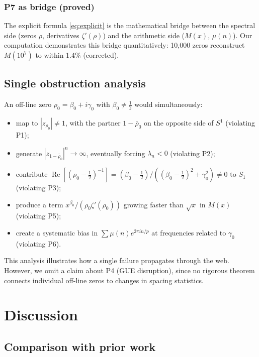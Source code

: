 \documentclass[11pt,a4paper]{article}
\theoremstyle{definition}
\DeclareMathOperator{\re}{Re}
\begin{document}
\subsubsection*{P7 as bridge (proved)}

The explicit formula \eqref{eq:explicit} is the mathematical bridge between the spectral side (zeros $\rho$, derivatives $\zeta'(\rho)$) and the arithmetic side ($M(x)$, $\mu(n)$). Our computation demonstrates this bridge quantitatively: 10{,}000 zeros reconstruct $M(10^7)$ to within 1.4\% (corrected).

\subsection{Single obstruction analysis}

An off-line zero $\rho_0 = \beta_0 + i\gamma_0$ with $\beta_0 \neq \tfrac{1}{2}$ would simultaneously:
\begin{itemize}
  \item map to $|z_{\rho_0}| \neq 1$, with the partner $1-\bar{\rho}_0$ on the opposite side of $S^1$ (violating P1);
  \item generate $|z_{1-\bar{\rho}_0}|^n \to \infty$, eventually forcing $\lambda_n < 0$ (violating P2);
  \item contribute $\re[(\rho_0 - \tfrac{1}{2})^{-1}] = (\beta_0 - \tfrac{1}{2})/((\beta_0 - \tfrac{1}{2})^2 + \gamma_0^2) \neq 0$ to $S_1$ (violating P3);
  \item produce a term $x^{\beta_0}/(\rho_0 \zeta'(\rho_0))$ growing faster than $\sqrt{x}$ in $M(x)$ (violating P5);
  \item create a systematic bias in $\sum \mu(n) e^{2\pi i n/p}$ at frequencies related to $\gamma_0$ (violating P6).
\end{itemize}
This analysis illustrates how a single failure propagates through the web. However, we omit a claim about P4 (GUE disruption), since no rigorous theorem connects individual off-line zeros to changes in spacing statistics.

\section{Discussion}
\label{sec:discussion}

\subsection{Comparison with prior work}
\end{document}
